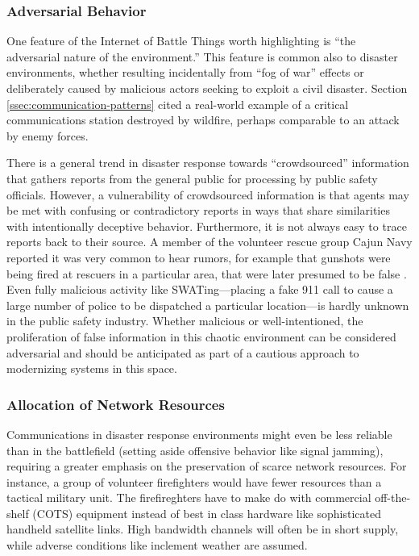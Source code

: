 \documentclass[]             %
{NASA}                       %
\theoremstyle{definition}
\begin{document}
\subsubsection{Adversarial Behavior}
One feature of the Internet of Battle Things worth highlighting is
``the adversarial nature of the environment.'' This feature is common
also to disaster environments, whether resulting incidentally from
``fog of war'' effects or deliberately caused by malicious actors
seeking to exploit a civil disaster. Section
\ref{ssec:communication-patterns} cited a real-world example of a
critical communications station destroyed by wildfire, perhaps
comparable to an attack by enemy forces.

There is a general trend in disaster response towards ``crowdsourced''
information that gathers reports from the general public for
processing by public safety officials. However, a vulnerability of
crowdsourced information is that agents may be met with confusing or
contradictory reports in ways that share similarities with
intentionally deceptive behavior. Furthermore, it is not always easy
to trace reports back to their source. A member of the volunteer
rescue group Cajun Navy reported it was very common to hear rumors,
for example that gunshots were being fired at rescuers in a particular
area, that were later presumed to be false \citationneeded. Even fully
malicious activity like SWATing---placing a fake 911 call to cause a
large number of police to be dispatched a particular location---is
hardly unknown in the public safety industry. Whether malicious or
well-intentioned, the proliferation of false information in this
chaotic environment can be considered adversarial and should be
anticipated as part of a cautious approach to modernizing systems in
this space.

\subsubsection{Allocation of Network Resources}
Communications in disaster response environments might even be less
reliable than in the battlefield (setting aside offensive behavior
like signal jamming), requiring a greater emphasis on the preservation
of scarce network resources. For instance, a group of volunteer
firefighters would have fewer resources than a tactical military unit.
The firefireghters have to make do with commercial off-the-shelf
(COTS) equipment instead of best in class hardware like sophisticated
handheld satellite links. High bandwidth channels will often be in
short supply, while adverse conditions like inclement weather are
assumed.
\end{document}
